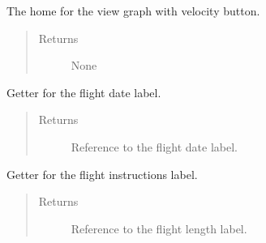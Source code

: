 \documentclass[letterpaper,10pt,english]{sphinxmanual}
\begin{document}
\begin{fulllineitems}
\begin{fulllineitems}
\begin{quote}
\begin{description}
\end{description}\end{quote}

\end{fulllineitems}


\begin{fulllineitems}
\label{\detokenize{index:src.Views.View_ReportScreen.ReportWindow.BtnViewGraphVelocity}}
The home for the view graph with velocity button.
\begin{quote}\begin{description}
\item[{Returns}] \leavevmode
None

\end{description}\end{quote}

\end{fulllineitems}


\begin{fulllineitems}
\label{\detokenize{index:src.Views.View_ReportScreen.ReportWindow.LblFlightDate}}
Getter for the flight date label.
\begin{quote}\begin{description}
\item[{Returns}] \leavevmode
Reference to the flight date label.

\end{description}\end{quote}

\end{fulllineitems}


\begin{fulllineitems}
\label{\detokenize{index:src.Views.View_ReportScreen.ReportWindow.LblFlightInstructions}}
Getter for the flight instructions label.
\begin{quote}\begin{description}
\item[{Returns}] \leavevmode
Reference to the flight length label.


\end{description}
\end{quote}
\end{fulllineitems}
\end{fulllineitems}
\end{document}
